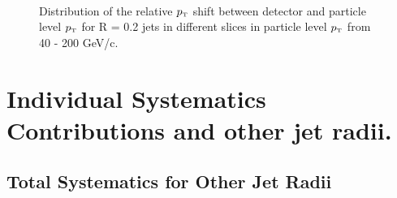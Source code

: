 \documentclass[ALICE]{ALICE_analysis_notes}
\newcommand{\pT}{$p_{\mbox{\tiny T}}$\xspace}
\begin{document}
\begin{appendix}
\begin{figure}[h!]
    \qquad
    \\
    \qquad
    \caption{Distribution of the relative \pT shift between detector and particle level \pT for R = 0.2 jets in different slices in particle level \pT from 40 - 200 GeV/c.}
    \label{fig:EnergyScaleSlices2}
\end{figure}

\newpage

\section{Individual Systematics Contributions and other jet radii.}
\label{sec:AppendixSystematics}

\subsection{Total Systematics for Other Jet Radii}
\label{subsec:appendixTotalSystematics}


\end{appendix}
\end{document}
